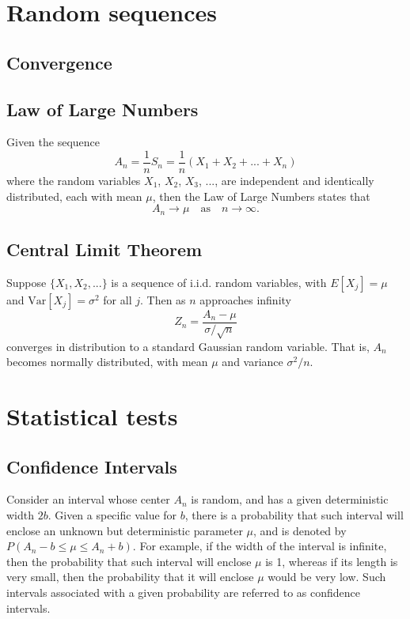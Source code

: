 \documentclass[a4paper,12pt]{article}
\begin{document}
\section{Random sequences}
\subsection{Convergence}
\subsection{Law of Large Numbers}
Given the sequence
\begin{equation}
A_n = \frac{1}{n}S_n = \frac{1}{n} (X_1 + X_2 + ... + X_n )
\end{equation}
where the random variables $X_1$, $X_2$, $X_3$, ..., are independent and identically distributed, each with mean $\mu$, then the Law of Large Numbers states that
\begin{equation}
A_n \to \mu \quad \text{as} \quad n \to \infty.
\end{equation}

\subsection{Central Limit Theorem}
Suppose $\{X_1, X_2, ...\}$ is a sequence of i.i.d. random variables, with $E[X_j] = \mu$ and $\text{Var}[X_j] = \sigma^2$ for all $j$. Then as $n$ approaches infinity
\begin{equation}
Z_n = \frac{A_n - \mu}{\sigma/\sqrt{n}}
\end{equation}
converges in distribution to a standard Gaussian random variable. That is, $A_n$ becomes normally distributed, with mean $\mu$ and variance $\sigma^2/n$.
\section{Statistical tests}
\subsection{Confidence Intervals}
Consider an interval whose center $A_n$ is random, and has a given deterministic width $2b$. Given a specific value for $b$, there is a probability that such interval will enclose an unknown but deterministic parameter $\mu$, and is denoted by $P(A_n - b \le \mu \le A_n + b)$. For example, if the width of the interval is infinite, then the probability that such interval will enclose $\mu$ is 1, whereas if its length is very small, then the probability that it will enclose $\mu$ would be very low. Such intervals associated with a given probability are referred to as confidence intervals.
\end{document}
